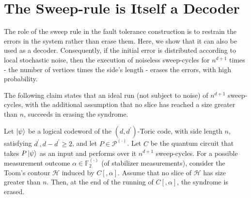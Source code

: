 

\section{The Sweep-rule is Itself a Decoder}
The role of the sweep rule in the fault tolerance construction is to restrain the errors in the system rather than erase them. Here, we show that it can also be used as a decoder. Consequently, if the initial error is distributed according to local stochastic noise, then the execution of noiseless sweep-cycles for $n^{d+1}$ times - the number of vertices times the side's length - erases the errors, with high probability. 





The following claim states that an ideal run (not subject to noise) of $n^{d+1}$ sweep-cycles, with the additional assumption that no slice has reached a size greater than $n$, succeeds in erasing the syndrome.
\begin{claim}
  \label{claim:decodestopnoise}
  Let $\ket{\psi}$ be a logical codeword of the $(d,d^{\prime})$-Toric code, with side length $n$, satisfying $d^{\prime},d-d^{\prime}\ge 2$, and let $P \in \mathcal{P}^{(\cdot)}$. Let $C$ be the quantum circuit that takes $P\ket{\psi}$ as an input and performs over it $n^{d+1}$ sweep-cycles. For a possible measurement outcome $\alpha \in \mathbb{F}_{2}^{(\cdot)}$ (of stabilizer measurements), consider the Toom's contour $\mathcal{H}$ induced by $C[,\alpha]$. Assume that no slice of $\mathcal{H}$ has size greater than $n$. Then, at the end of the running of $C[,\alpha]$, the syndrome is erased.
\end{claim}
